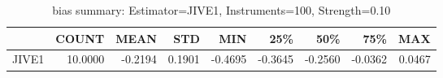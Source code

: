 \begin{table}[ht]
\centering
\caption{bias summary: Estimator=JIVE1, Instruments=100, Strength=0.10}
\begin{tabular}{lrrrrrrrr}
\toprule
 & COUNT & MEAN & STD & MIN & 25\% & 50\% & 75\% & MAX \\
\midrule
JIVE1 & 10.0000 & -0.2194 & 0.1901 & -0.4695 & -0.3645 & -0.2560 & -0.0362 & 0.0467 \\
\bottomrule
\end{tabular}
\end{table}
